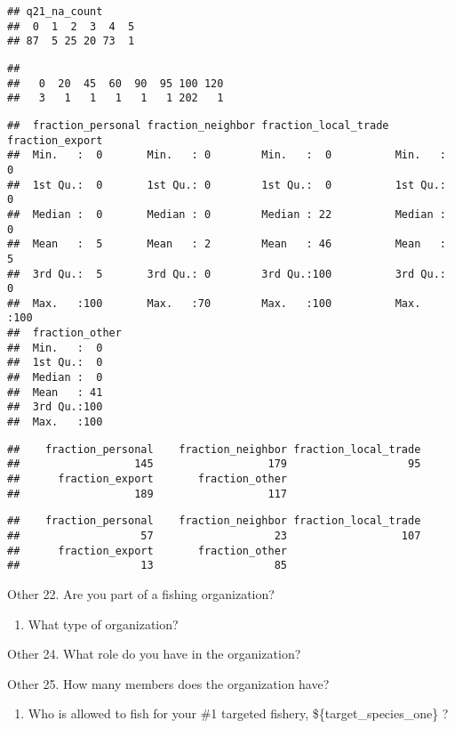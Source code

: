 \documentclass[]{article}
\providecommand{\tightlist}{%
  \setlength{\itemsep}{0pt}\setlength{\parskip}{0pt}}
\begin{document}
\begin{verbatim}
## q21_na_count
##  0  1  2  3  4  5 
## 87  5 25 20 73  1
\end{verbatim}

\begin{verbatim}
## 
##   0  20  45  60  90  95 100 120 
##   3   1   1   1   1   1 202   1
\end{verbatim}

\begin{verbatim}
##  fraction_personal fraction_neighbor fraction_local_trade fraction_export
##  Min.   :  0       Min.   : 0        Min.   :  0          Min.   :  0    
##  1st Qu.:  0       1st Qu.: 0        1st Qu.:  0          1st Qu.:  0    
##  Median :  0       Median : 0        Median : 22          Median :  0    
##  Mean   :  5       Mean   : 2        Mean   : 46          Mean   :  5    
##  3rd Qu.:  5       3rd Qu.: 0        3rd Qu.:100          3rd Qu.:  0    
##  Max.   :100       Max.   :70        Max.   :100          Max.   :100    
##  fraction_other
##  Min.   :  0   
##  1st Qu.:  0   
##  Median :  0   
##  Mean   : 41   
##  3rd Qu.:100   
##  Max.   :100
\end{verbatim}

\begin{verbatim}
##    fraction_personal    fraction_neighbor fraction_local_trade 
##                  145                  179                   95 
##      fraction_export       fraction_other 
##                  189                  117
\end{verbatim}

\begin{verbatim}
##    fraction_personal    fraction_neighbor fraction_local_trade 
##                   57                   23                  107 
##      fraction_export       fraction_other 
##                   13                   85
\end{verbatim}

Other 22. Are you part of a fishing organization?

\begin{enumerate}
\def\labelenumi{\arabic{enumi}.}
\setcounter{enumi}{22}
\tightlist
\item
  What type of organization?
\end{enumerate}

Other 24. What role do you have in the organization?

Other 25. How many members does the organization have?

\begin{enumerate}
\def\labelenumi{\arabic{enumi}.}
\setcounter{enumi}{25}
\tightlist
\item
  Who is allowed to fish for your \#1 targeted fishery,
  \$\{target\_species\_one\} ?
\end{enumerate}
\end{document}
